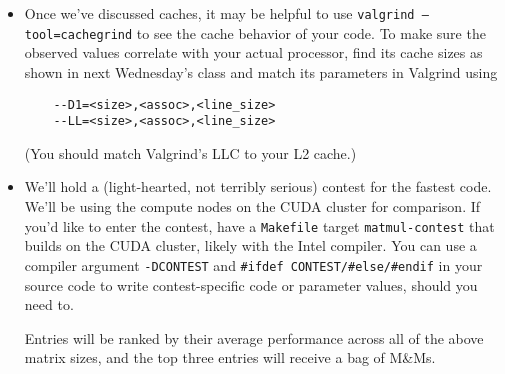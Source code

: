 \documentclass[11pt]{article}
\begin{document}
\begin{itemize}
  \item Once we've discussed caches, it may be helpful to use
    \texttt{valgrind --tool=cachegrind} to see the cache behavior of
    your code. To make sure the observed values correlate with your
    actual processor, find its cache sizes as shown in next
    Wednesday's class and match its parameters in Valgrind using
    \begin{lstlisting}
    --D1=<size>,<assoc>,<line_size>
    --LL=<size>,<assoc>,<line_size>
    \end{lstlisting}
    (You should match Valgrind's LLC to your L2 cache.)

  \item We'll hold a (light-hearted, not terribly serious) contest for
    the fastest code. We'll be using the compute nodes on the CUDA
    cluster for comparison. If you'd like to enter the contest, have a
    \texttt{Makefile} target \texttt{matmul-contest} that builds on
    the CUDA cluster, likely with the Intel compiler. You can use a
    compiler argument \texttt{-DCONTEST} and \texttt{\#ifdef
    CONTEST/\#else/\#endif} in your source code to write
    contest-specific code or parameter values, should you need to.

    Entries will be ranked by their average performance across all of
    the above matrix sizes, and the top three entries will receive
    a bag of M\&Ms.
\end{itemize}
\end{document}
